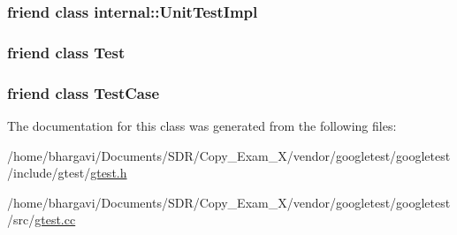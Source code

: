 \subsubsection[{\texorpdfstring{internal\+::\+Unit\+Test\+Impl}{internal::UnitTestImpl}}]{\setlength{\rightskip}{0pt plus 5cm}friend class {\bf internal\+::\+Unit\+Test\+Impl}\hspace{0.3cm}{\ttfamily [friend]}}\hypertarget{classtesting_1_1_test_info_acc0a5e7573fd6ae7ad1878613bb86853}{}\label{classtesting_1_1_test_info_acc0a5e7573fd6ae7ad1878613bb86853}
\subsubsection[{\texorpdfstring{Test}{Test}}]{\setlength{\rightskip}{0pt plus 5cm}friend class {\bf Test}\hspace{0.3cm}{\ttfamily [friend]}}\hypertarget{classtesting_1_1_test_info_a5b78b1c2e1fa07ffed92da365593eaa4}{}\label{classtesting_1_1_test_info_a5b78b1c2e1fa07ffed92da365593eaa4}
\subsubsection[{\texorpdfstring{Test\+Case}{TestCase}}]{\setlength{\rightskip}{0pt plus 5cm}friend class {\bf Test\+Case}\hspace{0.3cm}{\ttfamily [friend]}}\hypertarget{classtesting_1_1_test_info_aff779e55b06adfa7c0088bd10253f0f0}{}\label{classtesting_1_1_test_info_aff779e55b06adfa7c0088bd10253f0f0}


The documentation for this class was generated from the following files\+:\begin{DoxyCompactItemize}
\item 
/home/bhargavi/\+Documents/\+S\+D\+R/\+Copy\+\_\+\+Exam\+\_\+X/vendor/googletest/googletest/include/gtest/\hyperlink{gtest_8h}{gtest.\+h}\item 
/home/bhargavi/\+Documents/\+S\+D\+R/\+Copy\+\_\+\+Exam\+\_\+X/vendor/googletest/googletest/src/\hyperlink{gtest_8cc}{gtest.\+cc}\end{DoxyCompactItemize}
